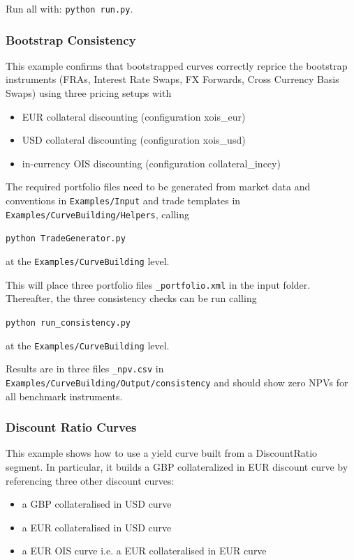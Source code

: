 Run all with: {\tt python run.py}.

\subsubsection{Bootstrap Consistency}

This example confirms that bootstrapped curves correctly reprice the bootstrap instruments
(FRAs, Interest Rate Swaps, FX Forwards, Cross Currency Basis Swaps) using three pricing setups with
\begin{itemize}
\item EUR collateral discounting (configuration xois\_eur)
\item USD collateral discounting (configuration xois\_usd)
\item in-currency OIS discounting (configuration collateral\_inccy)
\end{itemize}

\medskip
The required portfolio files need to be generated from market data and conventions in
{\tt Examples/Input} and trade templates in
{\tt Examples/CurveBuilding/Helpers}, calling

\medskip
\centerline{\tt python TradeGenerator.py} at the {\tt Examples/CurveBuilding} level.

\medskip
This will place three portfolio files {\tt *\_portfolio.xml} in the input folder.
Thereafter, the three consistency checks can be run calling

\medskip
\centerline{\tt python run\_consistency.py} at the {\tt Examples/CurveBuilding} level.

\medskip
Results are in three files {\tt *\_npv.csv} in {\tt Examples/CurveBuilding/Output/consistency}
and should show zero NPVs for all benchmark instruments.

\subsubsection{Discount Ratio Curves}

This example shows how to use a yield curve built from a DiscountRatio segment.
In particular, it builds a GBP collateralized in EUR discount curve by referencing
three other discount curves:
\begin{itemize}
\item a GBP collateralised in USD curve
\item a EUR collateralised in USD curve
\item a EUR OIS curve i.e. a EUR collateralised in EUR curve
\end{itemize}

